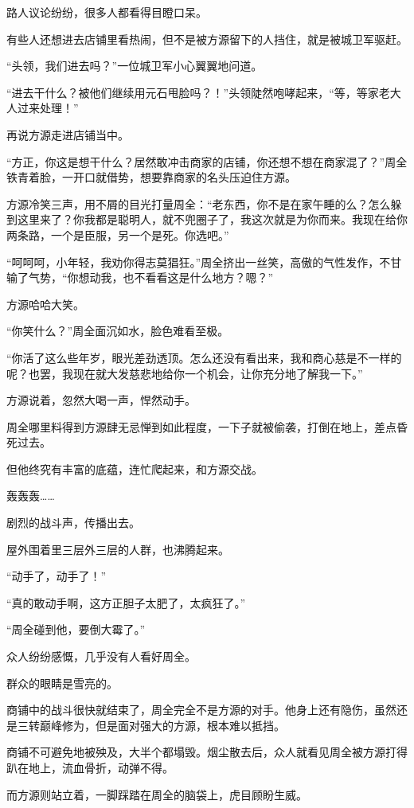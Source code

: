 \begin{this_body}
路人议论纷纷，很多人都看得目瞪口呆。

有些人还想进去店铺里看热闹，但不是被方源留下的人挡住，就是被城卫军驱赶。

“头领，我们进去吗？”一位城卫军小心翼翼地问道。

“进去干什么？被他们继续用元石甩脸吗？！”头领陡然咆哮起来，“等，等家老大人过来处理！”

再说方源走进店铺当中。

“方正，你这是想干什么？居然敢冲击商家的店铺，你还想不想在商家混了？”周全铁青着脸，一开口就借势，想要靠商家的名头压迫住方源。

方源冷笑三声，用不屑的目光打量周全：“老东西，你不是在家午睡的么？怎么躲到这里来了？你我都是聪明人，就不兜圈子了，我这次就是为你而来。我现在给你两条路，一个是臣服，另一个是死。你选吧。”

“呵呵呵，小年轻，我劝你得志莫猖狂。”周全挤出一丝笑，高傲的气性发作，不甘输了气势，“你想动我，也不看看这是什么地方？嗯？”

方源哈哈大笑。

“你笑什么？”周全面沉如水，脸色难看至极。

“你活了这么些年岁，眼光差劲透顶。怎么还没有看出来，我和商心慈是不一样的呢？也罢，我现在就大发慈悲地给你一个机会，让你充分地了解我一下。”

方源说着，忽然大喝一声，悍然动手。

周全哪里料得到方源肆无忌惮到如此程度，一下子就被偷袭，打倒在地上，差点昏死过去。

但他终究有丰富的底蕴，连忙爬起来，和方源交战。

轰轰轰……

剧烈的战斗声，传播出去。

屋外围着里三层外三层的人群，也沸腾起来。

“动手了，动手了！”

“真的敢动手啊，这方正胆子太肥了，太疯狂了。”

“周全碰到他，要倒大霉了。”

众人纷纷感慨，几乎没有人看好周全。

群众的眼睛是雪亮的。

商铺中的战斗很快就结束了，周全完全不是方源的对手。他身上还有隐伤，虽然还是三转巅峰修为，但是面对强大的方源，根本难以抵挡。

商铺不可避免地被殃及，大半个都塌毁。烟尘散去后，众人就看见周全被方源打得趴在地上，流血骨折，动弹不得。

而方源则站立着，一脚踩踏在周全的脑袋上，虎目顾盼生威。


\end{this_body}
